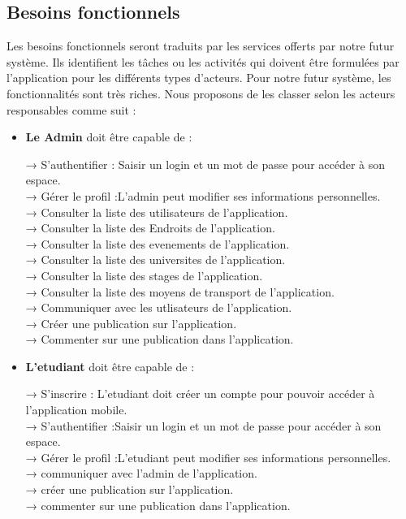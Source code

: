 \begin{sloppypar}
\subsection{Besoins fonctionnels }
\vspace{-3mm}
Les besoins fonctionnels seront traduits par les services offerts par notre futur système.
Ils identifient les tâches ou les activités qui doivent être formulées par l’application pour les différents types d’acteurs. Pour notre futur système, les fonctionnalités sont très riches. Nous
proposons de les classer selon les acteurs responsables comme suit :
\begin{itemize}
\item [•] \textbf{Le Admin} doit être capable de :

→ S’authentifier : Saisir un login et un mot de passe pour accéder à son espace.\\
→ Gérer le profil :L'admin peut modifier ses informations personnelles.\\
→ Consulter la liste des utilisateurs de l’application.\\
→ Consulter la liste des Endroits de l’application.\\
→ Consulter la liste des evenements de l’application.\\
→ Consulter la liste des universites de l’application.\\
→ Consulter la liste des stages de l’application.\\
→ Consulter la liste des moyens de transport de l’application.\\
→ Communiquer avec les utlisateurs  de l’application.\\
→ Créer une publication sur  l’application.\\
→ Commenter sur  une publication dans  l’application.

\item [•] \textbf{L'etudiant } doit être capable de :

→ S’inscrire : L'etudiant doit créer un compte pour pouvoir accéder à l’application mobile.\\
→ S’authentifier :Saisir un login et un mot de passe pour accéder à son espace.\\
→ Gérer le profil :L'etudiant peut modifier ses informations personnelles.\\
→ communiquer avec l'admin de l’application.\\
→ créer une publication sur  l’application.\\
→ commenter sur  une publication dans  l’application.
\end{itemize}
\vspace{-5mm}

\end{sloppypar}
